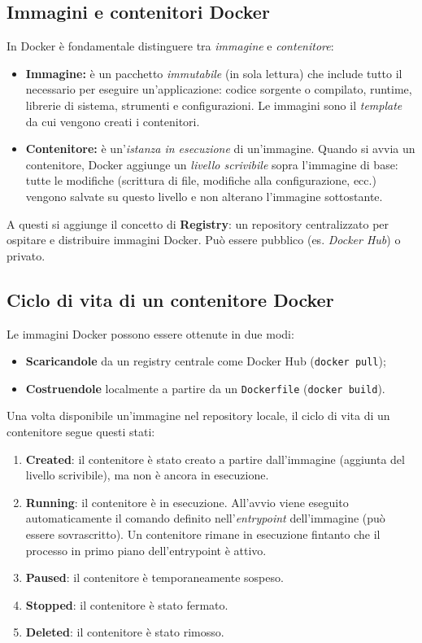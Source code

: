 \documentclass{article}
\begin{document}
\subsection*{Immagini e contenitori Docker}

In Docker è fondamentale distinguere tra \textit{immagine} e \textit{contenitore}:

\begin{itemize}
    \item \textbf{Immagine:} è un pacchetto \textit{immutabile} (in sola lettura) che include tutto il necessario per eseguire un'applicazione: codice sorgente o compilato, runtime, librerie di sistema, strumenti e configurazioni. Le immagini sono il \textit{template} da cui vengono creati i contenitori.

    \item \textbf{Contenitore:} è un'\textit{istanza in esecuzione} di un'immagine. Quando si avvia un contenitore, Docker aggiunge un \textit{livello scrivibile} sopra l'immagine di base: tutte le modifiche (scrittura di file, modifiche alla configurazione, ecc.) vengono salvate su questo livello e non alterano l'immagine sottostante.
\end{itemize}

A questi si aggiunge il concetto di \textbf{Registry}: un repository centralizzato per ospitare e distribuire immagini Docker. Può essere pubblico (es. \textit{Docker Hub}) o privato.

\subsection*{Ciclo di vita di un contenitore Docker}

Le immagini Docker possono essere ottenute in due modi:
\begin{itemize}
    \item \textbf{Scaricandole} da un registry centrale come Docker Hub (\texttt{docker pull});
    \item \textbf{Costruendole} localmente a partire da un \texttt{Dockerfile} (\texttt{docker build}).
\end{itemize}

Una volta disponibile un'immagine nel repository locale, il ciclo di vita di un contenitore segue questi stati:

\begin{enumerate}
    \item \textbf{Created}: il contenitore è stato creato a partire dall'immagine (aggiunta del livello scrivibile), ma non è ancora in esecuzione.
    \item \textbf{Running}: il contenitore è in esecuzione. All'avvio viene eseguito automaticamente il comando definito nell'\textit{entrypoint} dell'immagine (può essere sovrascritto). Un contenitore rimane in esecuzione fintanto che il processo in primo piano dell'entrypoint è attivo.
    \item \textbf{Paused}: il contenitore è temporaneamente sospeso.
    \item \textbf{Stopped}: il contenitore è stato fermato.
    \item \textbf{Deleted}: il contenitore è stato rimosso.
\end{enumerate}
\end{document}

